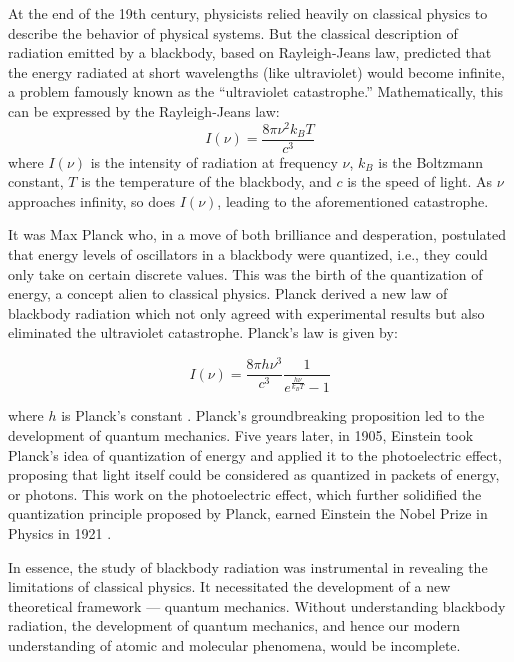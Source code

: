 \documentclass[10pt,letterpaper,onecolumn]{article}
\begin{document}
At the end of the 19th century, physicists relied heavily on classical 
physics to describe the behavior of physical systems. But the classical 
description of radiation emitted by a blackbody, based on Rayleigh-Jeans 
law, predicted that the energy radiated at short wavelengths 
(like ultraviolet) would become infinite, a problem famously known as the 
``ultraviolet catastrophe.'' Mathematically, this can be expressed by the 
Rayleigh-Jeans law:
\begin{equation}
I(\nu) = \frac{8 \pi \nu^2 k_B T}{c^3}
\end{equation}
where \( I(\nu) \) is the intensity of radiation 
at frequency \( \nu \), \( k_B \) is the Boltzmann 
constant, \( T \) is the temperature of the blackbody, and \( c \) 
is the speed of light. As \( \nu \) approaches infinity, 
so does \( I(\nu) \), leading to the aforementioned catastrophe.

It was Max Planck who, in a move of both brilliance and desperation, 
postulated that energy levels of oscillators in a blackbody were quantized, 
i.e., they could only take on certain discrete values. This was the birth 
of the quantization of energy, a concept alien to classical physics. 
Planck derived a new law of blackbody radiation which not only agreed 
with experimental results but also eliminated the ultraviolet catastrophe. 
Planck's law is given by:

\begin{equation}
I(\nu) = \frac{8 \pi h \nu^3}{c^3} \frac{1}{e^{\frac{h \nu}{k_B T}} - 1}
\end{equation}

where \( h \) is Planck's constant \cite{planck1901}.
Planck's groundbreaking proposition led to the development of 
quantum mechanics. Five years later, in 1905, Einstein took Planck's 
idea of quantization of energy and applied it to the photoelectric effect, 
proposing that light itself could be considered as quantized in packets of 
energy, or photons. This work on the photoelectric effect, which further 
solidified the quantization principle proposed by Planck, earned Einstein 
the Nobel Prize in Physics in 1921 \cite{einstein1905}.

In essence, the study of blackbody radiation was instrumental in revealing the limitations of classical physics.
It necessitated the development of a new theoretical framework — quantum mechanics. Without understanding blackbody 
radiation, the development of quantum mechanics, and hence our modern understanding of atomic and molecular phenomena,
 would be incomplete.
\end{document}
